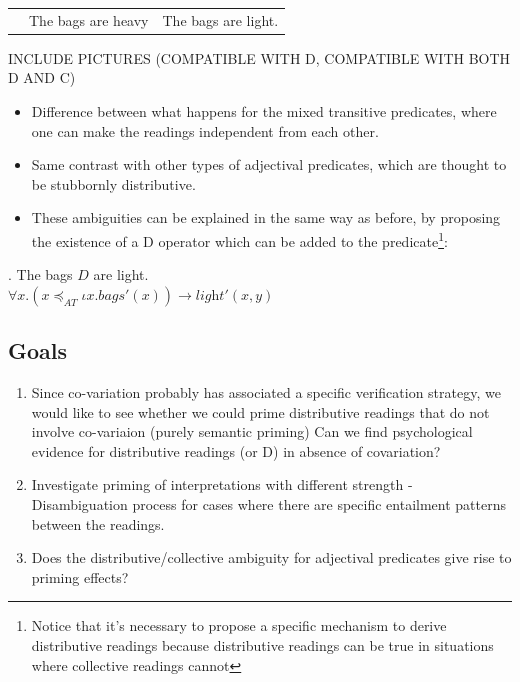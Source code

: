 \documentclass[a4paper]{article}
\begin{document}
\begin{table}
\begin{tabular}{c|c|c|}
& The bags are heavy & The bags are light.\\

\end{tabular}
\end{table}

INCLUDE PICTURES (COMPATIBLE WITH D, COMPATIBLE WITH BOTH D AND C)


\begin{itemize}
\item Difference between what happens for the mixed transitive predicates, where one can make the readings independent from each other. 

\item Same contrast with other types of adjectival predicates, which are thought to be stubbornly distributive. 

\item These ambiguities can be explained in the same way as before, by proposing the existence of a D operator which can be added to the predicate\footnote{Notice that it's necessary to propose a specific mechanism to derive distributive readings because distributive readings can be true in situations where collective readings cannot}:
\end{itemize}

\ex. The bags $D$ are light.\\
    $\forall x. (x\preceq_{AT}\iota x.\mathit{bags}'(x)) \rightarrow  \textit{light}'(x,y)$

\subsection{Goals}

\begin{enumerate}
\item Since co-variation probably has associated a specific verification strategy, we would like to see whether we could prime distributive readings that do not involve co-variaion (purely semantic priming)
Can we find psychological evidence for distributive readings (or D) in absence of covariation? 

\item Investigate priming of interpretations with different strength  - Disambiguation process for cases where there are specific entailment patterns between the readings.

\item Does the distributive/collective ambiguity for adjectival predicates give rise to priming effects?

\end{enumerate}
\end{document}
